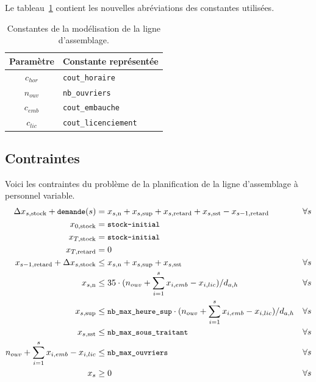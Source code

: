 \documentclass[12pt,oneside,a4paper]{article}
\newcommand{\myX}[2]{x_{#1,\text{#2}}}
\newcommand{\xSemaine}[1]{\myX{s}{#1}}
\newcommand{\xn}{\xSemaine{n}}
\newcommand{\xsup}{\xSemaine{sup}}
\newcommand{\xstock}{\xSemaine{stock}}
\newcommand{\xretard}{\xSemaine{retard}}
\newcommand{\xsst}{\xSemaine{sst}}
\newcommand{\texttts}[1]{{\small\texttt{#1}}}
\begin{document}
Le tableau~\ref{tab:constantesQuestion7} contient les nouvelles abréviations
des constantes utilisées.
\begin{table}[h]
  \begin{center}
  \begin{tabular}{|c|l|}
    \hline
    Paramètre & Constante représentée \\
    \hline
    \hline
    $c_{hor}$ & \texttt{cout\_horaire} \\
    \hline
    $n_{ouv}$ & \texttt{nb\_ouvriers} \\
    \hline
    $c_{emb}$ & \texttt{cout\_embauche} \\
    \hline
    $c_{lic}$ & \texttt{cout\_licenciement} \\
    \hline
  \end{tabular}
  \caption{Constantes de la modélisation de la ligne d'assemblage.}
  \label{tab:constantesQuestion7}
  \end{center}
\end{table}

\subsection*{Contraintes}
Voici les contraintes du problème de la planification 
de la ligne d’assemblage à personnel variable.
\begin{align*}
  \Delta\xstock + \texttts{demande}(s) &= \xn + \xsup 
  + \xretard + \xsst - \myX{s-1}{retard} &\forall s \\
  \myX{0}{stock} &= \texttts{stock-initial} \\
  \myX{T}{stock} &= \texttts{stock-initial} \\
  \myX{T}{retard}&= 0 \\
  \myX{s-1}{retard} + \Delta\xstock &\leq \xn + \xsup + \xsst &\forall s \\
  \xn &\leq 35\cdot (n_{ouv} + \sum_{i=1}^{s} x_{i,emb} - x_{i,lic})/ d_{a,h}
  &\forall s \\
  \xsup &\leq \texttts{nb\_max\_heure\_sup}\cdot (n_{ouv} + \sum_{i=1}^{s} x_{i,emb} - x_{i,lic})/ d_{a,h}
  &\forall s \\
  \xsst &\leq \texttts{nb\_max\_sous\_traitant} &\forall s \\
  n_{ouv} + \sum_{i=1}^{s} x_{i,emb} - x_{i,lic} &\leq \texttts{nb\_max\_ouvriers}  &\forall s \\
  x_s &\geq 0 &\forall s
\end{align*}
\end{document}
